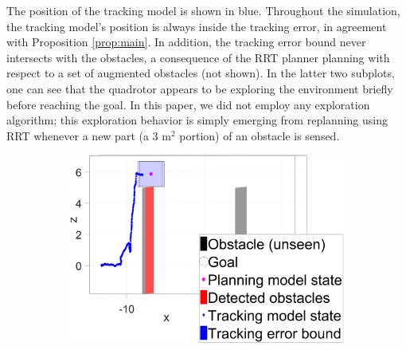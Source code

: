 The position of the tracking model is shown in blue. Throughout the simulation, the tracking model's position is always inside the tracking error, in agreement with Proposition \ref{prop:main}. In addition, the tracking error bound never intersects with the obstacles, a consequence of the RRT planner planning with respect to a set of augmented obstacles (not shown). In the latter two subplots, one can see that the quadrotor appears to be exploring the environment briefly before reaching the goal. In this paper, we did not employ any exploration algorithm; this exploration behavior is simply emerging from replanning using RRT whenever a new part (a $3$ m$^2$ portion) of an obstacle is sensed.

\begin{figure}
  \centering
  \begin{subfigure}[t]{0.45\columnwidth} \label{subfig:sim_1}
    \includegraphics[width=\columnwidth]{fig/224}
    \caption{}
  \end{subfigure}
  \begin{subfigure}[t]{0.35\columnwidth} \label{subfig:sim_2}

\end{subfigure}
\end{figure}
